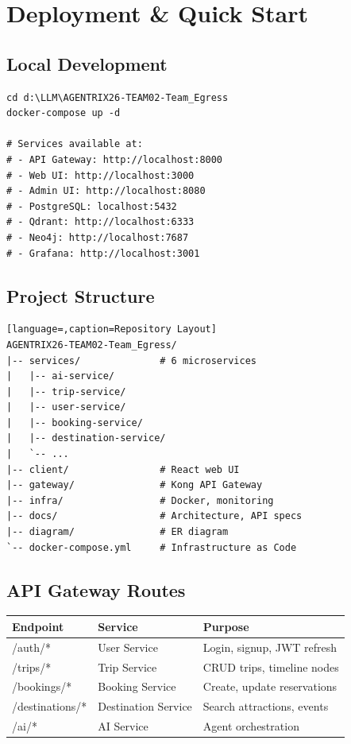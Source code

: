 \documentclass[11pt]{article}
\begin{document}
\section{Deployment \& Quick Start}

\subsection{Local Development}

\begin{lstlisting}[caption=Start the entire platform]
cd d:\LLM\AGENTRIX26-TEAM02-Team_Egress
docker-compose up -d

# Services available at:
# - API Gateway: http://localhost:8000
# - Web UI: http://localhost:3000
# - Admin UI: http://localhost:8080
# - PostgreSQL: localhost:5432
# - Qdrant: http://localhost:6333
# - Neo4j: http://localhost:7687
# - Grafana: http://localhost:3001
\end{lstlisting}

\subsection{Project Structure}

\begin{lstlisting}[language=,caption=Repository Layout]
AGENTRIX26-TEAM02-Team_Egress/
|-- services/              # 6 microservices
|   |-- ai-service/
|   |-- trip-service/
|   |-- user-service/
|   |-- booking-service/
|   |-- destination-service/
|   `-- ...
|-- client/                # React web UI
|-- gateway/               # Kong API Gateway
|-- infra/                 # Docker, monitoring
|-- docs/                  # Architecture, API specs
|-- diagram/               # ER diagram
`-- docker-compose.yml     # Infrastructure as Code
\end{lstlisting}

\subsection{API Gateway Routes}

\begin{table}[H]\centering\small
\begin{tabular}{|l|l|l|}
\hline
\textbf{Endpoint} & \textbf{Service} & \textbf{Purpose} \\
\hline
/auth/* & User Service & Login, signup, JWT refresh \\
\hline
/trips/* & Trip Service & CRUD trips, timeline nodes \\
\hline
/bookings/* & Booking Service & Create, update reservations \\
\hline
/destinations/* & Destination Service & Search attractions, events \\
\hline
/ai/* & AI Service & Agent orchestration \\
\hline
\end{tabular}
\end{table}
\end{document}
